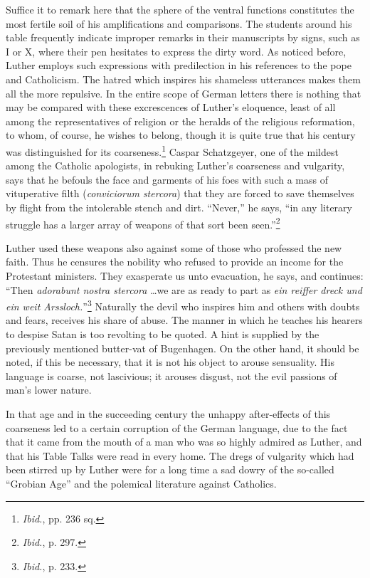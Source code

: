 Suffice it to remark here that the sphere of the ventral functions
constitutes the most fertile soil of his amplifications and comparisons.
The students around his table frequently indicate improper remarks
in their manuscripts by signs, such as I or X, where their pen hesitates
to express the dirty word. As noticed before, Luther employs such expressions
with predilection in his references to the pope and Catholicism. The hatred
which inspires his shameless utterances makes them
all the more repulsive. In the entire scope of German letters there is
nothing that may be compared with these excrescences of Luther’s
eloquence, least of all among the representatives of religion or the
heralds of the religious reformation, to whom, of course, he wishes to
belong, though it is quite true that his century was distinguished for
its coarseness.\footnote{\textit{Ibid.}, pp. 236 sq.}
 Caspar Schatzgeyer, one of the mildest among the
Catholic apologists, in rebuking Luther’s coarseness and vulgarity,
says that he befouls the face and garments of his foes with such a mass
of vituperative filth (\textit{conviciorum stercora}) that they are forced to
save themselves by flight from the intolerable stench and dirt.
“Never,” he says, “in any literary struggle has a larger array of
weapons of that sort been seen.”\footnote{\textit{Ibid.}, p. 297.}

Luther used these weapons also against some of those who professed
the new faith. Thus he censures the nobility who refused to provide
an income for the Protestant ministers. They exasperate us unto
evacuation, he says, and continues: “Then \textit{adorabunt nostra stercora}
\dots we are as ready to part as \textit{ein reiffer dreck und ein weit
Arssloch.}”\footnote{\textit{Ibid.}, p. 233.}
Naturally the devil who inspires him and others with
doubts and fears, receives his share of abuse. The manner in which
he teaches his hearers to despise Satan is too revolting to be quoted.
A hint is supplied by the previously mentioned butter-vat of Bugenhagen.
On the other hand, it should be noted, if this be necessary, that
it is not his object to arouse sensuality. His language is coarse, not
lascivious; it arouses disgust, not the evil passions of man’s lower
nature.

In that age and in the succeeding century the unhappy after-effects
of this coarseness led to a certain corruption of the German
language, due to the fact that it came from the mouth of a man who
was so highly admired as Luther, and that his Table Talks were read
in every home. The dregs of vulgarity which had been stirred up by
Luther were for a long time a sad dowry of the so-called “Grobian
Age” and the polemical literature against Catholics.
